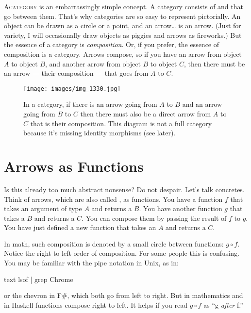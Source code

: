 
\lettrine[lhang=0.17]{A}{category} is an embarrassingly simple concept.
A category consists of  and  that go between them. That's
why categories are so easy to represent pictorially. An object can be
drawn as a circle or a point, and an arrow\ldots{} is an arrow. (Just
for variety, I will occasionally draw objects as piggies and arrows as
fireworks.) But the essence of a category is \emph{composition}. Or, if you
prefer, the essence of composition is a category. Arrows compose, so
if you have an arrow from object $A$ to object $B$, and another arrow from
object $B$ to object $C$, then there must be an arrow --- their composition
--- that goes from $A$ to $C$.

\begin{figure}
  \centering
  \texttt{[image: images/img\_1330.jpg]}
  \caption{In a category, if there is an arrow going from $A$ to $B$ and an arrow going from $B$ to $C$
    then there must also be a direct arrow from $A$ to $C$ that is their composition. This diagram is not a full
    category because it’s missing identity morphisms (see later).}
\end{figure}

\section{Arrows as Functions}

Is this already too much abstract nonsense? Do not despair. Let's talk
concretes. Think of arrows, which are also called , as
functions. You have a function $f$ that takes an argument of type $A$ and
returns a $B$. You have another function $g$ that takes a $B$ and returns a $C$.
You can compose them by passing the result of $f$ to $g$. You have just
defined a new function that takes an $A$ and returns a $C$.

In math, such composition is denoted by a small circle between
functions: $g \circ f$. Notice the right to left order of composition. For some
people this is confusing. You may be familiar with the pipe notation in
Unix, as in:

\begin{snip}{text}
lsof | grep Chrome
\end{snip}
or the chevron \code{>>} in F\#, which both
go from left to right. But in mathematics and in Haskell functions
compose right to left. It helps if you read $g \circ f$ as ``g \emph{after} f.''

